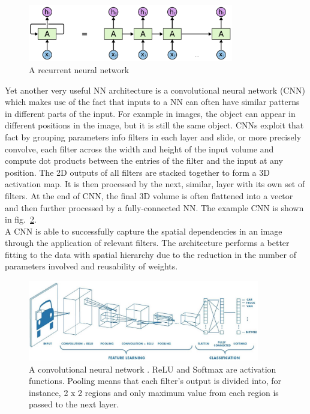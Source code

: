 \begin{figure}[H]
\includegraphics[width=0.8\textwidth,keepaspectratio]{figures/RNN.png}
\caption{A recurrent neural network \cite{Blog.RNNs}}
\label{Fig.RNN}
\end{figure}

Yet another very useful NN architecture is a convolutional neural network (CNN) which makes use of the fact that inputs to a NN can often have similar patterns in different parts of the input. For example in images, the object can appear in different positions in the image, but it is still the same object. CNNs exploit that fact by grouping parameters info filters in each layer and slide, or more precisely convolve, each filter across the width and height of the input volume and compute dot products between the entries of the filter and the input at any position. The 2D outputs of all filters are stacked together to form a 3D activation map. It is then processed by the next, similar, layer with its own set of filters. At the end of CNN, the final 3D volume is often flattened into a vector and then further processed by a fully-connected NN. The example CNN is shown in fig.~\ref{Fig.CNN}. \\
A CNN is able to successfully capture the spatial dependencies in an image through the application of relevant filters. The architecture performs a better fitting to the data with spatial hierarchy due to the reduction in the number of parameters involved and reusability of weights.

\begin{figure}[H]
\includegraphics[width=0.9\textwidth,keepaspectratio]{figures/CNN.png}
\caption[A convolutional neural network]{A convolutional neural network \cite{Blog.CNNs}. ReLU \cite{Algo.ReLU} and Softmax are activation functions. Pooling means that each filter's output is divided into, for instance, 2 x 2 regions and only maximum value from each region is passed to the next layer.}
\label{Fig.CNN}
\end{figure}

